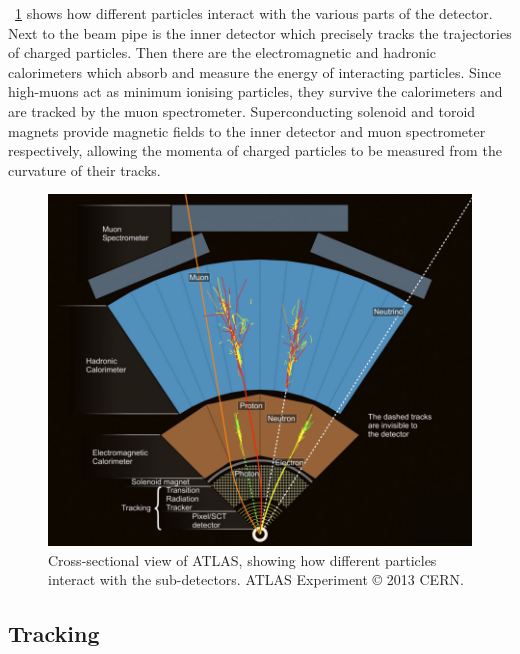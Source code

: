 \Figure~\ref{fig:atlas_wedge} shows how different particles interact with the various 
parts of the detector. Next to the beam pipe is the inner detector which precisely tracks 
the trajectories of charged particles. Then there are the electromagnetic and hadronic 
calorimeters which absorb and measure the energy of interacting particles. Since 
high-\pt muons act as minimum ionising particles, they survive the calorimeters and are 
tracked by the muon spectrometer. Superconducting solenoid and toroid magnets provide 
magnetic fields to the inner detector and muon spectrometer respectively, allowing the 
momenta of charged particles to be measured from the curvature of their tracks.

\begin{figure}
	\includegraphics[width=0.98\largefigwidth]{tex/experiment/atlas_wedge}
	\caption{Cross-sectional view of ATLAS, showing how different particles interact with 
	the sub-detectors. ATLAS Experiment \copyright\xspace 2013 CERN.}
	\label{fig:atlas_wedge}
\end{figure}



\subsection{Tracking}
\label{sec:atlas:id}

